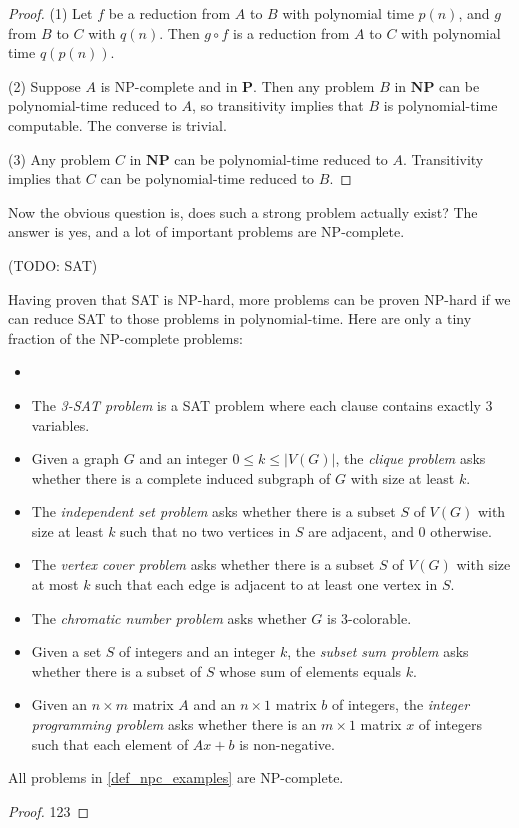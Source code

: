         \begin{proof}
            (1) Let $f$ be a reduction from $A$ to $B$ with polynomial time $p(n)$, and $g$ from $B$ to $C$ with $q(n)$. Then $g \circ f$ is a reduction from $A$ to $C$ with polynomial time $q(p(n))$.
            
            (2) Suppose $A$ is NP-complete and in $\mathbf{P}$. Then any problem $B$ in $\mathbf{NP}$ can be polynomial-time reduced to $A$, so transitivity implies that $B$ is polynomial-time computable. The converse is trivial.
            
            (3) Any problem $C$ in $\mathbf{NP}$ can be polynomial-time reduced to $A$. Transitivity implies that $C$ can be polynomial-time reduced to $B$.
        \end{proof}
        
        Now the obvious question is, does such a strong problem actually exist? The answer is yes, and a lot of important problems are NP-complete.
        
        (TODO: SAT)
        
        Having proven that SAT is NP-hard, more problems can be proven NP-hard if we can reduce SAT to those problems in polynomial-time. Here are only a tiny fraction of the NP-complete problems:
        
        \begin{defn} \label{def_npc_examples} \begin{itemize}
            \item[]
            \item The \emph{3-SAT problem} is a SAT problem where each clause contains exactly 3 variables.
            \item Given a graph $G$ and an integer $0 \leq k \leq |V(G)|$, the \emph{clique problem} asks whether there is a complete induced subgraph of $G$ with size at least $k$.
            \item The \emph{independent set problem} asks whether there is a subset $S$ of $V(G)$ with size at least $k$ such that no two vertices in $S$ are adjacent, and 0 otherwise.
            \item The \emph{vertex cover problem} asks whether there is a subset $S$ of $V(G)$ with size at most $k$ such that each edge is adjacent to at least one vertex in $S$.
            \item The \emph{chromatic number problem} asks whether $G$ is 3-colorable.
            \item Given a set $S$ of integers and an integer $k$, the \emph{subset sum problem} asks whether there is a subset of $S$ whose sum of elements equals $k$.
            \item Given an $n \times m$ matrix $A$ and an $n \times 1$ matrix $b$ of integers, the \emph{integer programming problem} asks whether there is an $m \times 1$ matrix $x$ of integers such that each element of $Ax+b$ is non-negative.
        \end{itemize}
        \end{defn}
        
        \begin{thm} \label{thm_npc_examples}
            All problems in \ref{def_npc_examples} are NP-complete.
        \end{thm}
        
        \begin{proof}
            123
        \end{proof}
